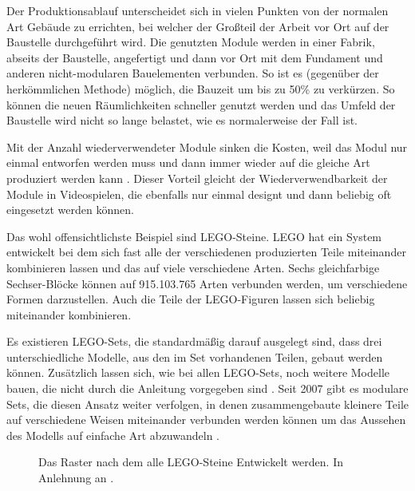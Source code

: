 Der Produktionsablauf unterscheidet sich in vielen Punkten von der normalen Art Gebäude zu errichten, bei welcher der Großteil der Arbeit vor Ort auf der Baustelle durchgeführt wird. Die genutzten Module werden in einer Fabrik, abseits der Baustelle, angefertigt und dann vor Ort mit dem  Fundament und anderen nicht-modularen Bauelementen verbunden. So ist es (gegenüber der herkömmlichen Methode) möglich, die Bauzeit um bis zu 50\%  zu verkürzen. So können die neuen Räumlichkeiten schneller genutzt werden und das Umfeld der Baustelle wird nicht so lange belastet, wie es normalerweise der Fall ist. \parencite{Lawson}
\par
Mit der Anzahl wiederverwendeter Module sinken die Kosten, weil das Modul nur einmal entworfen werden muss und dann immer wieder auf die gleiche Art produziert werden kann \parencite{Lawson}. Dieser Vorteil gleicht der Wiederverwendbarkeit der Module in Videospielen, die ebenfalls nur einmal designt und dann beliebig oft eingesetzt werden können.
\par
Das wohl offensichtlichste Beispiel sind LEGO-Steine. LEGO hat ein System entwickelt bei dem sich fast alle der verschiedenen produzierten Teile miteinander kombinieren lassen und das auf viele verschiedene Arten. Sechs gleichfarbige Sechser-Blöcke können auf 915.103.765 Arten \parencite[S.\,10]{LegoBuch} verbunden werden, um verschiedene Formen darzustellen. Auch die Teile der LEGO-Figuren lassen sich beliebig miteinander kombinieren. 
\par
Es existieren LEGO-Sets, die standardmäßig darauf ausgelegt sind, dass drei unterschiedliche Modelle, aus den im Set vorhandenen Teilen, gebaut werden können. Zusätzlich lassen sich, wie bei allen LEGO-Sets, noch weitere Modelle bauen, die nicht durch die Anleitung vorgegeben sind \parencite{Lego3in1}. Seit 2007 gibt es modulare Sets, die diesen Ansatz weiter verfolgen, in denen zusammengebaute kleinere Teile auf verschiedene Weisen miteinander verbunden werden können um das Aussehen des Modells auf einfache Art abzuwandeln \parencite{LegoMod}.
\begin{figure}[H]
\centering
  \caption{Das Raster nach dem alle LEGO-Steine Entwickelt werden. In Anlehnung an \parencite[S.\,11]{LegoBuch}.}
\label{legoRaster}
\end{figure}
